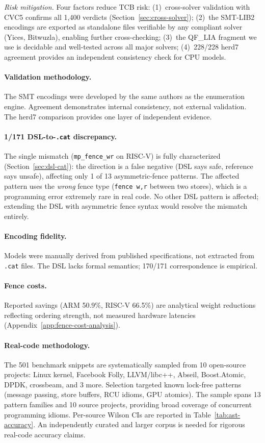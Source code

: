 \documentclass[11pt]{article}
\begin{document}
\emph{Risk mitigation.}
Four factors reduce TCB risk:
(1)~cross-solver validation with CVC5 confirms all 1{,}400 verdicts
(Section~\ref{sec:cross-solver});
(2)~the SMT-LIB2 encodings are exported as standalone files verifiable
by any compliant solver (Yices, Bitwuzla), enabling further
cross-checking;
(3)~the QF\_LIA fragment we use is decidable and well-tested across
all major solvers;
(4)~228/228 herd7 agreement provides an independent consistency check
for CPU models.

\paragraph{Validation methodology.}
The SMT encodings were developed by the same authors as the
enumeration engine. Agreement demonstrates internal consistency,
not external validation. The herd7 comparison provides one layer
of independent evidence.

\paragraph{1/171 DSL-to-\texttt{.cat} discrepancy.}
The single mismatch (\texttt{mp\_fence\_wr} on RISC-V) is fully
characterized (Section~\ref{sec:dsl-cat}):
the direction is a false negative (DSL says safe, reference says
unsafe), affecting only 1 of 13 asymmetric-fence patterns.
The affected pattern uses the \emph{wrong} fence type
(\texttt{fence w,r} between two stores), which is a programming
error extremely rare in real code.
No other DSL pattern is affected; extending the DSL with
asymmetric fence syntax would resolve the mismatch entirely.

\paragraph{Encoding fidelity.}
Models were manually derived from published specifications, not
extracted from \texttt{.cat} files. The DSL lacks formal semantics;
170/171 correspondence is empirical.

\paragraph{Fence costs.}
Reported savings (ARM 50.9\%, RISC-V 66.5\%) are analytical weight
reductions reflecting ordering strength, not measured hardware
latencies (Appendix~\ref{app:fence-cost-analysis}).

\paragraph{Real-code methodology.}
The 501 benchmark snippets are systematically sampled from 10
open-source projects: Linux kernel, Facebook Folly, LLVM/libc++,
Abseil, Boost.Atomic, DPDK, crossbeam, and 3 more.
Selection targeted known lock-free patterns (message passing,
store buffers, RCU idioms, GPU atomics).
The sample spans 13 pattern families and 10 source projects,
providing broad coverage of concurrent programming idioms.
Per-source Wilson CIs are reported in Table~\ref{tab:ast-accuracy}.
An independently curated and larger corpus is needed for rigorous
real-code accuracy claims.
\end{document}
